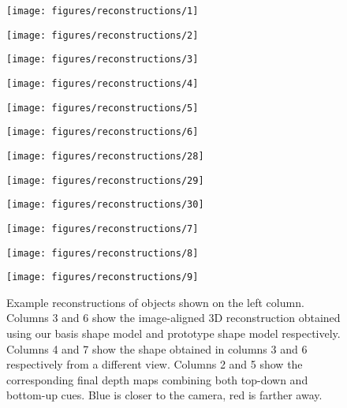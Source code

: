 \documentclass[runningheads]{llncs}
\begin{document}
\begin{figure}[htb!]
  \texttt{[image: figures/reconstructions/1]}
  
 \texttt{[image: figures/reconstructions/2]}
 
 \texttt{[image: figures/reconstructions/3]}

  \texttt{[image: figures/reconstructions/4]} 
 
 \texttt{[image: figures/reconstructions/5]}    
 
\texttt{[image: figures/reconstructions/6]} 
 
 \texttt{[image: figures/reconstructions/28]}
 
\texttt{[image: figures/reconstructions/29]}

\texttt{[image: figures/reconstructions/30]}

 \texttt{[image: figures/reconstructions/7]}
  
   \texttt{[image: figures/reconstructions/8]}

\texttt{[image: figures/reconstructions/9]}
       
\caption{\label{fig:recons1}Example reconstructions of objects shown on the left column. Columns 3 and 6  show the image-aligned 3D reconstruction obtained using our basis shape model and prototype shape model respectively. Columns 4 and 7 show the shape obtained in  columns 3 and 6 respectively from a different view. Columns 2 and 5 show the corresponding final depth maps combining both top-down and bottom-up cues. Blue is closer to the camera, red is farther away.}
 
\end{figure}
\end{document}
